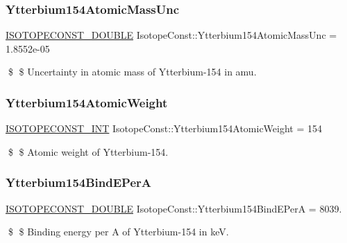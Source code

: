 \subsubsection{\texorpdfstring{Ytterbium154\+Atomic\+Mass\+Unc}{Ytterbium154AtomicMassUnc}}
{\footnotesize\ttfamily \mbox{\hyperlink{group___isotope_const-_macros_ga8f45a7272ce02c0b4c65c44636ed719a}{I\+S\+O\+T\+O\+P\+E\+C\+O\+N\+S\+T\+\_\+\+D\+O\+U\+B\+LE}} Isotope\+Const\+::\+Ytterbium154\+Atomic\+Mass\+Unc = 1.\+8552e-\/05}

\$ \$ Uncertainty in atomic mass of Ytterbium-\/154 in amu. \mbox{\label{group___isotope_const-_ytterbium-_yb154_ga30c0dafbf9de92b1c752584564cdb2eb}} 
\subsubsection{\texorpdfstring{Ytterbium154\+Atomic\+Weight}{Ytterbium154AtomicWeight}}
{\footnotesize\ttfamily \mbox{\hyperlink{group___isotope_const-_macros_ga5f18360b3e99483a35c32d789e62621c}{I\+S\+O\+T\+O\+P\+E\+C\+O\+N\+S\+T\+\_\+\+I\+NT}} Isotope\+Const\+::\+Ytterbium154\+Atomic\+Weight = 154}

\$ \$ Atomic weight of Ytterbium-\/154. \mbox{\label{group___isotope_const-_ytterbium-_yb154_ga80e63b3a7da035c4fff480553cad4a04}} 
\subsubsection{\texorpdfstring{Ytterbium154\+Bind\+E\+PerA}{Ytterbium154BindEPerA}}
{\footnotesize\ttfamily \mbox{\hyperlink{group___isotope_const-_macros_ga8f45a7272ce02c0b4c65c44636ed719a}{I\+S\+O\+T\+O\+P\+E\+C\+O\+N\+S\+T\+\_\+\+D\+O\+U\+B\+LE}} Isotope\+Const\+::\+Ytterbium154\+Bind\+E\+PerA = 8039.}

\$ \$ Binding energy per A of Ytterbium-\/154 in keV. \mbox{\label{group___isotope_const-_ytterbium-_yb154_gae6658d468b848abd4ff643441b5643b3}} 
